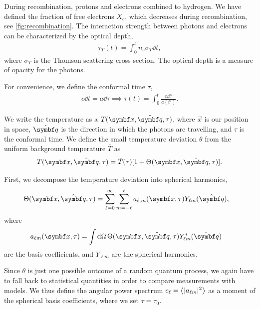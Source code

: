 During recombination, protons and electrons combined to hydrogen. We have defined the fraction of free electrons $X_e$, which decreases during recombination, see \cref{fig:recombination}. The interaction strength between photons and electrons can be characterized by the optical depth,
\begin{align*}
	\tau_T(t) = \int_0^t n_e \sigma_T \dd{t},
\end{align*}
where $\sigma_T$ is the Thomson scattering cross-section. The optical depth is a measure of opacity for the photons.

For convenience, we define the conformal time $\tau$,
\begin{align*}
	c \dd{t} = a \dd{\tau}
	\implies \tau(t) = \int_0^t \frac{c \dd{t'}}{a(t')}.
\end{align*}

We write the temperature as a $T(\vec{x}, \uvec{q}, \tau)$, where $\vec{x}$ is our position in space, $\uvec{q}$ is the direction in which the photons are travelling, and $\tau$ is the conformal time. We define the small temperature deviation $\theta$ from the uniform background temperature $\bar{T}$ as
\begin{align*}
	T(\vec{x}, \uvec{q}, \tau) = \bar{T}(\tau) [1 + \Theta(\vec{x}, \uvec{q}, \tau)].
\end{align*}

First, we decompose the temperature deviation into spherical harmonics,
\begin{align*}
	\Theta(\vec{x}, \uvec{q}, \tau)
	&= \sum_{\ell=0}^{\infty} \sum_{m=-\ell}^{\ell} a_{\ell,m}(\vec{x}, \tau) Y_{\ell m}(\uvec{q}),
\end{align*}
where 
\begin{align*}
	a_{\ell m}(\vec{x}, \tau)
	&= \int \dd{\Omega} \Theta(\vec{x}, \uvec{q}, \tau) Y^*_{\ell m}(\uvec{q}) 	
\end{align*}
are the basis coefficients, and $Y_{\ell m}$ are the spherical harmonics.

Since $\theta$ is just one possible outcome of a random quantum process, we again have to fall back to statistical quantities in order to compare measurements with models.
We thus define the angular power spectrum $c_\ell = \left\langle \vert a_{\ell m}\vert^2 \right\rangle$ as a moment of the spherical basis coefficients, where we set $\tau = \tau_0$.


